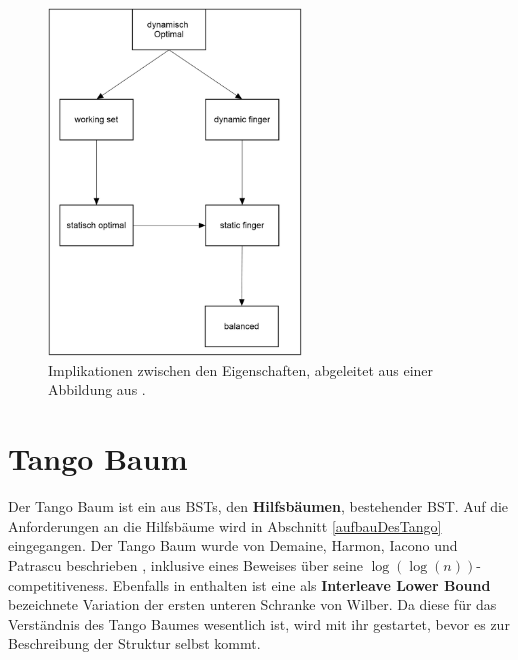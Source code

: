 \documentclass[a4paper,12pt]{article}
\begin{document}
\begin{figure}[H]
	\centering
	\includegraphics[width= 0.6\textwidth]{"Medien/DynOpt/upperBounds"}
	\caption{Implikationen zwischen den Eigenschaften, abgeleitet aus einer Abbildung aus \cite{upperBounds}. }
	\label{fig:upperBounds}
\end{figure}


\section{Tango Baum} \label{TangoAbschnitt}
Der Tango Baum ist ein aus BSTs, den \textbf{Hilfsbäumen}, bestehender BST. Auf die Anforderungen an die Hilfsbäume wird in Abschnitt \ref{aufbauDesTango} eingegangen. Der Tango Baum wurde  von Demaine, Harmon, Iacono und Patrascu beschrieben \cite{demainDinamicOpti}, inklusive eines Beweises über seine $\log\left(\log\left(n\right)\right)$-competitiveness. Ebenfalls in \cite{demainDinamicOpti} enthalten ist eine als \textbf{Interleave Lower Bound} bezeichnete Variation der ersten unteren Schranke von Wilber. Da diese für das Verständnis des Tango Baumes wesentlich ist, wird mit ihr gestartet, bevor es zur Beschreibung der Struktur selbst kommt. 
\end{document}
